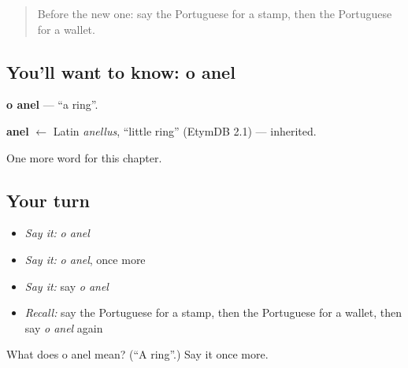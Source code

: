 \label{lesson:PT-C100-anel}



\begin{quote}
Before the new one: say the Portuguese for a stamp, then the Portuguese for a wallet.
\end{quote}

\subsection*{You'll want to know: o anel}
\textbf{o anel} — \textquotedblleft{}a ring\textquotedblright{}.

\begin{cousinweb}
\textbf{anel} $\leftarrow$ Latin \emph{anellus}, \textquotedblleft{}little ring\textquotedblright{} (EtymDB 2.1) — inherited.
\end{cousinweb}

\begin{grammarlens}[title={What you've built}]
One more word for this chapter.
\end{grammarlens}

\subsection*{Your turn}
\begin{itemize}
\raggedright
  \item \emph{Say it:} \emph{o anel}
  \item \emph{Say it:} \emph{o anel}, once more
  \item \emph{Say it:} say \emph{o anel}
  \item \emph{Recall:} say the Portuguese for a stamp, then the Portuguese for a wallet, then say \emph{o anel} again
\end{itemize}

\begin{tcolorbox}[breakable,colback=teal!4,colframe=teal!35!black,title={Before you move on}]
What does o anel mean? (\textquotedblleft{}A ring\textquotedblright{}.) Say it once more.
\end{tcolorbox}
